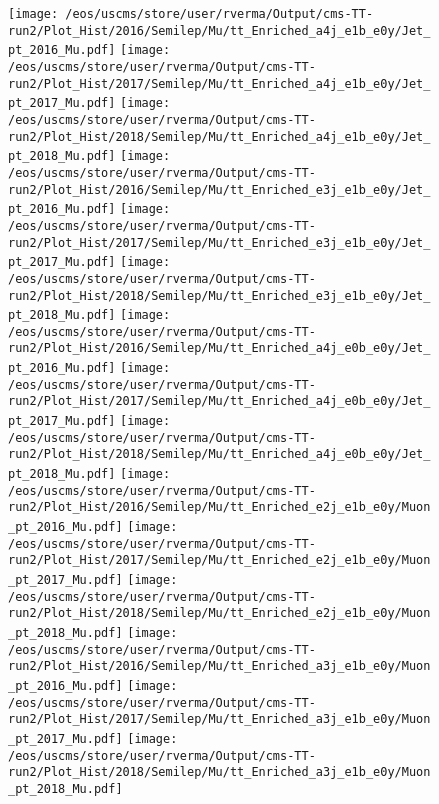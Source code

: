 \begin{figure}
\centering
\texttt{[image: /eos/uscms/store/user/rverma/Output/cms-TT-run2/Plot\_Hist/2016/Semilep/Mu/tt\_Enriched\_a4j\_e1b\_e0y/Jet\_pt\_2016\_Mu.pdf]}
\texttt{[image: /eos/uscms/store/user/rverma/Output/cms-TT-run2/Plot\_Hist/2017/Semilep/Mu/tt\_Enriched\_a4j\_e1b\_e0y/Jet\_pt\_2017\_Mu.pdf]}
\texttt{[image: /eos/uscms/store/user/rverma/Output/cms-TT-run2/Plot\_Hist/2018/Semilep/Mu/tt\_Enriched\_a4j\_e1b\_e0y/Jet\_pt\_2018\_Mu.pdf]}
\texttt{[image: /eos/uscms/store/user/rverma/Output/cms-TT-run2/Plot\_Hist/2016/Semilep/Mu/tt\_Enriched\_e3j\_e1b\_e0y/Jet\_pt\_2016\_Mu.pdf]}
\texttt{[image: /eos/uscms/store/user/rverma/Output/cms-TT-run2/Plot\_Hist/2017/Semilep/Mu/tt\_Enriched\_e3j\_e1b\_e0y/Jet\_pt\_2017\_Mu.pdf]}
\texttt{[image: /eos/uscms/store/user/rverma/Output/cms-TT-run2/Plot\_Hist/2018/Semilep/Mu/tt\_Enriched\_e3j\_e1b\_e0y/Jet\_pt\_2018\_Mu.pdf]}
\texttt{[image: /eos/uscms/store/user/rverma/Output/cms-TT-run2/Plot\_Hist/2016/Semilep/Mu/tt\_Enriched\_a4j\_e0b\_e0y/Jet\_pt\_2016\_Mu.pdf]}
\texttt{[image: /eos/uscms/store/user/rverma/Output/cms-TT-run2/Plot\_Hist/2017/Semilep/Mu/tt\_Enriched\_a4j\_e0b\_e0y/Jet\_pt\_2017\_Mu.pdf]}
\texttt{[image: /eos/uscms/store/user/rverma/Output/cms-TT-run2/Plot\_Hist/2018/Semilep/Mu/tt\_Enriched\_a4j\_e0b\_e0y/Jet\_pt\_2018\_Mu.pdf]}
\texttt{[image: /eos/uscms/store/user/rverma/Output/cms-TT-run2/Plot\_Hist/2016/Semilep/Mu/tt\_Enriched\_e2j\_e1b\_e0y/Muon\_pt\_2016\_Mu.pdf]}
\texttt{[image: /eos/uscms/store/user/rverma/Output/cms-TT-run2/Plot\_Hist/2017/Semilep/Mu/tt\_Enriched\_e2j\_e1b\_e0y/Muon\_pt\_2017\_Mu.pdf]}
\texttt{[image: /eos/uscms/store/user/rverma/Output/cms-TT-run2/Plot\_Hist/2018/Semilep/Mu/tt\_Enriched\_e2j\_e1b\_e0y/Muon\_pt\_2018\_Mu.pdf]}
\texttt{[image: /eos/uscms/store/user/rverma/Output/cms-TT-run2/Plot\_Hist/2016/Semilep/Mu/tt\_Enriched\_a3j\_e1b\_e0y/Muon\_pt\_2016\_Mu.pdf]}
\texttt{[image: /eos/uscms/store/user/rverma/Output/cms-TT-run2/Plot\_Hist/2017/Semilep/Mu/tt\_Enriched\_a3j\_e1b\_e0y/Muon\_pt\_2017\_Mu.pdf]}
\texttt{[image: /eos/uscms/store/user/rverma/Output/cms-TT-run2/Plot\_Hist/2018/Semilep/Mu/tt\_Enriched\_a3j\_e1b\_e0y/Muon\_pt\_2018\_Mu.pdf]}
\end{figure}

